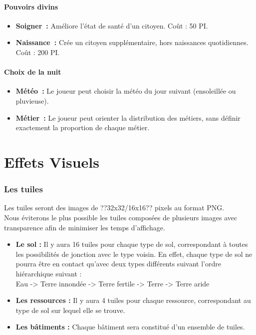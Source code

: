 \documentclass[a4paper]{article}
\begin{document}
      \subsection{Pouvoirs divins}
        \begin{itemize}
          \item \textbf{Soigner :} \small{ Améliore l'état de santé d'un citoyen. Coût : 50 PI.}
          \item \textbf{Naissance :} \small{ Crée un citoyen supplémentaire, hors naissances quotidiennes. Coût : 200 PI.}
        \end{itemize}

      \subsection{Choix de la nuit}
        \begin{itemize}
          \item \textbf{Météo :} \small{ Le joueur peut choisir la météo du jour suivant (ensoleillée ou pluvieuse).}
          \item \textbf{Métier :} \small{ Le joueur peut orienter la distribution des métiers, sans définir exactement la proportion de chaque métier.}
        \end{itemize}


  \part{Effets Visuels}


    \section{Les tuiles}
      Les tuiles seront des images de ??32x32/16x16?? pixels au format PNG.\\
      Nous éviterons le plus possible les tuiles composées de plusieurs images avec transparence afin de minimiser les temps d'affichage.
      \begin{itemize}
        \item \textbf{Le sol :}\small{ Il y aura 16 tuiles pour chaque type de sol, correspondant à toutes les possibilités de jonction avec le type voisin. En effet, chaque type de sol ne pourra être en contact qu'avec deux types différents suivant l'ordre hiérarchique suivant :\\
          Eau -> Terre innondée -> Terre fertile -> Terre -> Terre aride}
        \item \textbf{Les ressources :}\small{ Il y aura 4 tuiles pour chaque ressource, correspondant au type de sol sur lequel elle se trouve.}
        \item \textbf{Les bâtiments :}\small{ Chaque bâtiment sera constitué d'un ensemble de tuiles.}
      \end{itemize}
  
\end{document}
